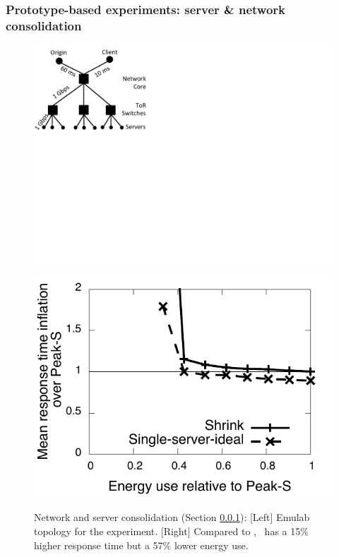 \subsubsection{Prototype-based experiments: server \& network consolidation}
\label{sec:emulab}

\begin{figure}
\includegraphics[scale=0.35]{figures/emulab-topo.pdf}
\includegraphics[scale=0.5]{graphs/final/emulab-mean.pdf}
\caption{Network and server consolidation (Section \ref{sec:emulab}): [Left] Emulab topology for the experiment. [Right] Compared to \peakS, \shrink\ has a 15\% higher response time but a 57\% lower energy use.}
\label{fig:emulab}
\end{figure}

